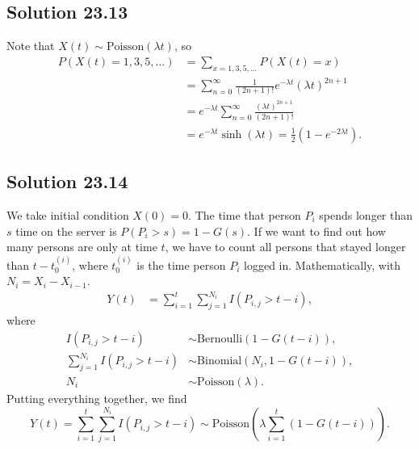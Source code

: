 \subsection*{Solution 23.13}

Note that $X(t) \sim \mathrm{Poisson}(\lambda t)$, so
\begin{equation*}
    \begin{split}
        P(X(t) = 1, 3, 5, ...)
            &= \sum_{x = 1, 3, 5, ...} P(X(t) = x) \\
            &= \sum_{n = 0}^{\infty} \frac{1}{(2n + 1)!} e^{-\lambda t} (\lambda t)^{2n + 1} \\
            &= e^{-\lambda t} \sum_{n = 0}^{\infty} \frac{(\lambda t)^{2n + 1}}{(2n + 1)!} \\
            &= e^{-\lambda t} \sinh(\lambda t)
            = \frac{1}{2}(1 - e^{-2 \lambda t}).
    \end{split}
\end{equation*}


\subsection*{Solution 23.14}

We take initial condition $X(0) = 0$.
The time that person $P_i$ spends longer than $s$ time on the server is $P(P_i > s) = 1 - G(s)$.
If we want to find out how many persons are only at time $t$, we have to count all persons that stayed longer than $t - t_0^{(i)}$, where $t_0^{(i)}$ is the time person $P_i$ logged in.
Mathematically, with $N_i = X_{i} - X_{i-1}$.
\begin{equation*}
    \begin{split}
        Y(t) &= \sum_{i = 1}^{t} \sum_{j = 1}^{N_i} I(P_{i, j} > t - i),
    \end{split}
\end{equation*}
where
\begin{equation*}
    \begin{split}
        I(P_{i,j} > t - i) &\sim \mathrm{Bernoulli}(1 - G(t - i)), \\
        \sum_{j = 1}^{N_i} I(P_{i,j} > t - i) &\sim \mathrm{Binomial}(N_i, 1 - G(t - i)), \\
        N_i &\sim \mathrm{Poisson}(\lambda).
    \end{split}
\end{equation*}
Putting everything together, we find
\begin{equation*}
    Y(t) = \sum_{i = 1}^{t} \sum_{j = 1}^{N_i} I(P_{i, j} > t - i)
        \sim \mathrm{Poisson}\left(\lambda \sum_{i = 1}^{t}(1 - G(t - i))\right).
\end{equation*}


